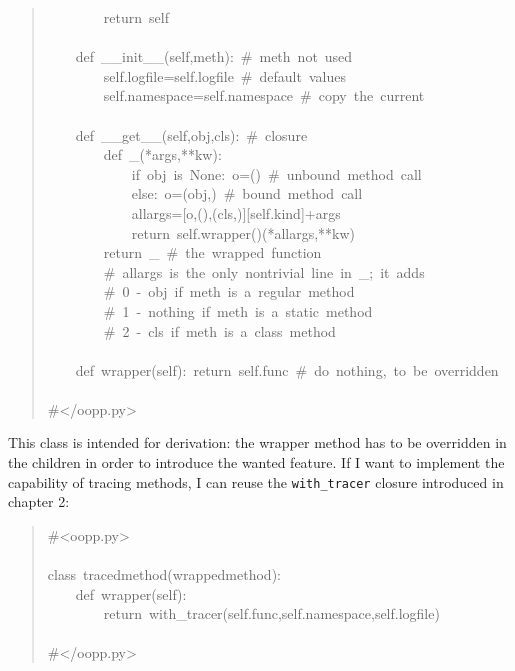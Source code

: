\documentclass[10pt,english]{article}
\begin{document}
\begin{quote}
\begin{ttfamily}
\begin{flushleft}
\mbox{~~~~~~~~return~self}\\
\mbox{}\\
\mbox{~~~~def~{\_}{\_}init{\_}{\_}(self,meth):~{\#}~meth~not~used}\\
\mbox{~~~~~~~~self.logfile=self.logfile~{\#}~default~values}\\
\mbox{~~~~~~~~self.namespace=self.namespace~{\#}~copy~the~current}\\
\mbox{}\\
\mbox{~~~~def~{\_}{\_}get{\_}{\_}(self,obj,cls):~{\#}~closure~}\\
\mbox{~~~~~~~~def~{\_}(*args,**kw):}\\
\mbox{~~~~~~~~~~~~if~obj~is~None:~o=()~{\#}~unbound~method~call}\\
\mbox{~~~~~~~~~~~~else:~o=(obj,)~{\#}~bound~method~call}\\
\mbox{~~~~~~~~~~~~allargs=[o,(),(cls,)][self.kind]+args~}\\
\mbox{~~~~~~~~~~~~return~self.wrapper()(*allargs,**kw)}\\
\mbox{~~~~~~~~return~{\_}~{\#}~the~wrapped~function}\\
\mbox{~~~~~~~~{\#}~allargs~is~the~only~nontrivial~line~in~{\_};~it~adds}\\
\mbox{~~~~~~~~{\#}~0~-~obj~if~meth~is~a~regular~method}\\
\mbox{~~~~~~~~{\#}~1~-~nothing~if~meth~is~a~static~method}\\
\mbox{~~~~~~~~{\#}~2~-~cls~if~meth~is~a~class~method}\\
\mbox{}\\
\mbox{~~~~def~wrapper(self):~return~self.func~{\#}~do~nothing,~to~be~overridden}\\
\mbox{}\\
\mbox{{\#}</oopp.py>}
\end{flushleft}\end{ttfamily}
\end{quote}

This class is intended for derivation: the wrapper method has to be overridden
in the children in order to introduce the wanted feature. If I want to 
implement the capability of tracing methods, I can reuse the \texttt{with{\_}tracer}
closure introduced in chapter 2:
\begin{quote}
\begin{ttfamily}\begin{flushleft}
\mbox{{\#}<oopp.py>}\\
\mbox{}\\
\mbox{class~tracedmethod(wrappedmethod):}\\
\mbox{~~~~def~wrapper(self):}\\
\mbox{~~~~~~~~return~with{\_}tracer(self.func,self.namespace,self.logfile)}\\
\mbox{~~~~~~~~}\\
\mbox{{\#}</oopp.py>}
\end{flushleft}\end{ttfamily}
\end{quote}
\end{document}
